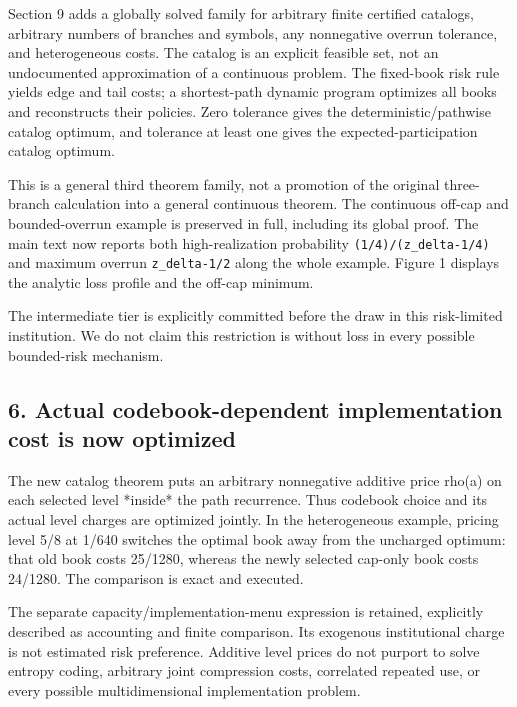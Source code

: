 \documentclass[11pt,letterpaper]{article}
\begin{document}
Section 9 adds a globally solved family for arbitrary finite certified catalogs, arbitrary numbers of branches and symbols, any nonnegative overrun tolerance, and heterogeneous costs. The catalog is an explicit feasible set, not an undocumented approximation of a continuous problem. The fixed-book risk rule yields edge and tail costs; a shortest-path dynamic program optimizes all books and reconstructs their policies. Zero tolerance gives the deterministic/pathwise catalog optimum, and tolerance at least one gives the expected-participation catalog optimum.



This is a general third theorem family, not a promotion of the original three-branch calculation into a general continuous theorem. The continuous off-cap and bounded-overrun example is preserved in full, including its global proof. The main text now reports both high-realization probability \nolinkurl{(1/4)/(z_delta-1/4)} and maximum overrun \nolinkurl{z_delta-1/2} along the whole example. Figure 1 displays the analytic loss profile and the off-cap minimum.



The intermediate tier is explicitly committed before the draw in this risk-limited institution. We do not claim this restriction is without loss in every possible bounded-risk mechanism.



\subsection*{6. Actual codebook-dependent implementation cost is now optimized}


The new catalog theorem puts an arbitrary nonnegative additive price rho(a) on each selected level *inside* the path recurrence. Thus codebook choice and its actual level charges are optimized jointly. In the heterogeneous example, pricing level 5/8 at 1/640 switches the optimal book away from the uncharged optimum: that old book costs 25/1280, whereas the newly selected cap-only book costs 24/1280. The comparison is exact and executed.



The separate capacity/implementation-menu expression is retained, explicitly described as accounting and finite comparison. Its exogenous institutional charge is not estimated risk preference. Additive level prices do not purport to solve entropy coding, arbitrary joint compression costs, correlated repeated use, or every possible multidimensional implementation problem.
\end{document}
